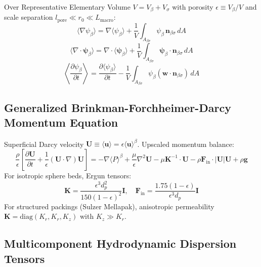 \documentclass[11pt,a4paper]{article}
\begin{document}
Over Representative Elementary Volume $V = V_\beta + V_\sigma$ with porosity $\epsilon \equiv V_\beta / V$ and scale separation $l_{\text{pore}} \ll r_0 \ll L_{\text{macro}}$:
\begin{equation}
\langle \nabla \psi_\beta \rangle = \nabla \langle \psi_\beta \rangle + \frac{1}{V} \int_{A_{\beta\sigma}} \psi_\beta \, \mathbf{n}_{\beta\sigma} \, dA
\end{equation}
\begin{equation}
\langle \nabla \cdot \boldsymbol{\psi}_\beta \rangle = \nabla \cdot \langle \boldsymbol{\psi}_\beta \rangle + \frac{1}{V} \int_{A_{\beta\sigma}} \boldsymbol{\psi}_\beta \cdot \mathbf{n}_{\beta\sigma} \, dA
\end{equation}
\begin{equation}
\left\langle \frac{\partial \psi_\beta}{\partial t} \right\rangle = \frac{\partial \langle \psi_\beta \rangle}{\partial t} - \frac{1}{V} \int_{A_{\beta\sigma}} \psi_\beta (\mathbf{w} \cdot \mathbf{n}_{\beta\sigma}) \, dA
\end{equation}

\subsection{Generalized Brinkman-Forchheimer-Darcy Momentum Equation}
\label{subsec:brinkman-forchheimer-darcy}

Superficial Darcy velocity $\mathbf{U} \equiv \langle \mathbf{u} \rangle = \epsilon \langle \mathbf{u} \rangle^\beta$. Upscaled momentum balance:
\begin{equation}
\frac{\rho}{\epsilon} \left[ \frac{\partial \mathbf{U}}{\partial t} + \frac{1}{\epsilon} (\mathbf{U} \cdot \nabla) \mathbf{U} \right] = -\nabla \langle P \rangle^\beta + \frac{\mu}{\epsilon} \nabla^2 \mathbf{U} - \mu \mathbf{K}^{-1} \cdot \mathbf{U} - \rho \mathbf{F}_{\text{in}} \cdot |\mathbf{U}| \mathbf{U} + \rho \mathbf{g}
\end{equation}
For isotropic sphere beds, Ergun tensors:
\begin{equation}
\mathbf{K} = \frac{\epsilon^3 d_p^2}{150 (1 - \epsilon)^2} \mathbf{I}, \quad \mathbf{F}_{\text{in}} = \frac{1.75 (1 - \epsilon)}{\epsilon^3 d_p} \mathbf{I}
\end{equation}
For structured packings (Sulzer Mellapak), anisotropic permeability $\mathbf{K} = \text{diag}(K_r, K_r, K_z)$ with $K_z \gg K_r$.

\subsection{Multicomponent Hydrodynamic Dispersion Tensors}
\label{subsec:dispersion-tensors}
\end{document}
